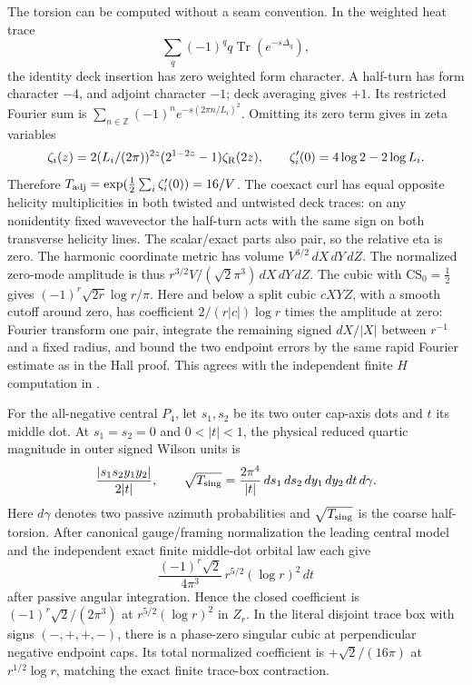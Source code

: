 The torsion can be computed without a seam convention. In the
weighted heat trace
\[
 \sum_q(-1)^q q\operatorname{Tr}(e^{-s\Delta_q}),
\]
the identity deck insertion has zero weighted form character.
A half-turn has form character \(-4\), and
adjoint character \(-1\); deck averaging gives \(+1\).
Its restricted Fourier sum is
\(\sum_{n\in\mathbb Z}(-1)^n e^{-s(2\pi n/L_i)^2}\).
Omitting its zero term gives in zeta variables
\[
 \zeta_i(z)=2(L_i/(2\pi))^{2z}
       (2^{1-2z}-1)\zeta_{\rm R}(2z),\qquad
 \zeta_i'(0)=4\log2-2\log L_i .
\]
Therefore \(T_{\rm adj}=\exp(\frac12\sum_i\zeta_i'(0))=16/V\).
The coexact curl has equal opposite helicity multiplicities in
both twisted and untwisted deck traces: on any nonidentity fixed
wavevector the half-turn acts with the same sign on both
transverse helicity lines. The scalar/exact parts also pair,
so the relative eta is zero. The harmonic coordinate metric
has volume \(V^{3/2}\,dX\,dY\,dZ\). The normalized zero-mode
amplitude is thus \(r^{3/2}V/(\sqrt2\pi^3)\,dX\,dY\,dZ\).
The cubic with \(\mathrm{CS}_0=\frac12\) gives
\((-1)^r\sqrt{2r}\log r/\pi\). Here and below a split
cubic \(cXYZ\), with a smooth cutoff around zero, has
coefficient \(2/(r|c|)\log r\) times the amplitude at zero:
Fourier transform one pair, integrate the remaining
signed \(dX/|X|\) between \(r^{-1}\) and a fixed radius,
and bound the two endpoint errors by the same rapid
Fourier estimate as in the Hall proof. This agrees
with the independent finite \(H\) computation in \cite{P48,P49}.

\begin{theorem}
\label{classic:thm:p4}
For the all-negative central \(P_4\), let \(s_1,s_2\) be its
two outer cap-axis dots and \(t\) its middle dot. At
\(s_1=s_2=0\) and \(0<|t|<1\), the physical reduced
quartic magnitude in outer signed Wilson units is
\[
 \frac{|s_1s_2 y_1y_2|}{2|t|},\qquad
 \sqrt{T_{\rm sing}}=
 \frac{2\pi^4}{|t|}\,ds_1\,ds_2\,dy_1\,dy_2\,dt\,d\gamma .
\]
Here \(d\gamma\) denotes two passive azimuth probabilities
and \(\sqrt{T_{\rm sing}}\) is the coarse half-torsion.
After canonical gauge/framing normalization the leading
central model and the independent exact finite middle-dot
orbital law each give
\[
 \frac{(-1)^r\sqrt2}{4\pi^3}\,
      r^{5/2}(\log r)^2\,dt
\]
after passive angular integration. Hence the closed coefficient
is \((-1)^r\sqrt2/(2\pi^3)\) at \(r^{5/2}(\log r)^2\)
in \(Z_r\). In the literal disjoint trace box with signs
\((-,+,+,-)\), there is a phase-zero singular cubic at
perpendicular negative endpoint caps. Its total normalized
coefficient is \(+\sqrt2/(16\pi)\) at \(r^{1/2}\log r\),
matching the exact finite trace-box contraction.
\end{theorem}


